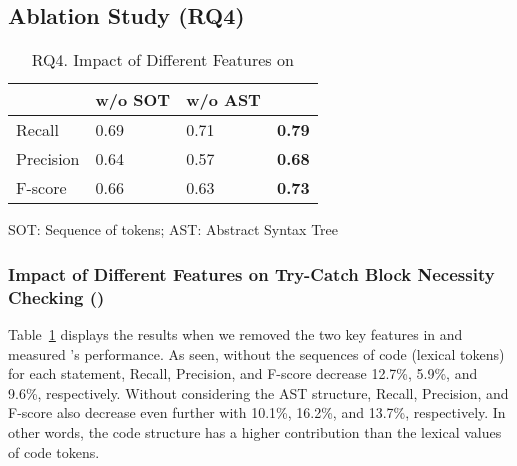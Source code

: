 \subsection{Ablation Study (RQ4)}
\label{sec:rq4}



\begin{table}[t]
  \caption{RQ4. Impact of Different Features on {\xblock}}
  \vspace{-12pt}
  \begin{center}
    \small
		\renewcommand{\arraystretch}{1}
		\begin{tabular}{p{1.75cm}<{\centering}|p{1.75cm}<{\centering}|p{1.75cm}<{\centering}|p{1.75cm}<{\centering}}
			\hline
			  & \tool w/o SOT & \tool w/o AST & \tool \\
			\hline
			Recall    & 0.69 & 0.71 & \textbf{0.79} \\
			Precision & 0.64 & 0.57 &\textbf{0.68} \\
			F-score   & 0.66 & 0.63 &\textbf{0.73} \\
			\hline
		\end{tabular}
		SOT: Sequence of tokens; AST: Abstract Syntax Tree
		\label{tab:sensi-xblock}
	\end{center}
\end{table}

\subsubsection{Impact of Different Features on Try-Catch Block Necessity Checking ({\xblock})}

Table~\ref{tab:sensi-xblock} displays the results when we removed the
two key features in {\tool} and measured {\xblock}'s performance. As
seen, without the sequences of code (lexical tokens) for each
statement, Recall, Precision, and F-score decrease 12.7\%, 5.9\%, and
9.6\%, respectively. Without considering the AST structure, Recall,
Precision, and F-score also decrease even further with 10.1\%, 16.2\%, and
13.7\%, respectively. In other words, the code structure has a higher
contribution than the lexical values of code tokens.




